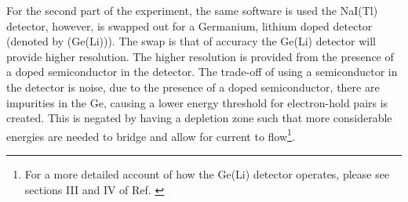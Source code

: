 For the second part of the experiment, the same software is used the NaI(Tl) detector, however, is swapped out for a Germanium, lithium doped detector (denoted by (Ge(Li))). The swap is that of accuracy the Ge(Li) detector will provide higher resolution. The higher resolution is provided from the presence of a doped semiconductor in the detector. The trade-off of using a semiconductor in the detector is noise, due to the presence of a doped semiconductor, there are impurities in the Ge, causing a lower energy threshold for electron-hold pairs is created. This is negated by having a depletion zone such that more considerable energies are needed to bridge and allow for current to flow\footnote{For a more detailed account of how the Ge(Li) detector operates, please see sections III and IV of Ref. \cite{rel_lab_manual} }.